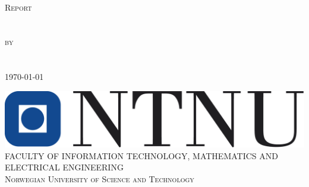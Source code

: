 \begin{titlepage}
\thispagestyle{empty}
\centering
\textsc{\MyFag{}} \\[3cm]
\textsc{\LARGE Report} \\
\textsc{\Mylab{}} \\[1cm]
\textsc{\Huge \MyTitle{}} \\[1cm]
\textsc{by} \\
\textsc{\MyAuthor{}} \\[1cm]
\textsc{\MyGroup{}} \\ [1cm]
\textsc{\large \today}

\begin{flushbottom}
\vfill
\includegraphics[scale=0.5]{img/ntnu} \\[0.5cm]
\textsc{\small FACULTY OF INFORMATION TECHNOLOGY, MATHEMATICS AND ELECTRICAL ENGINEERING \\ Norwegian University of Science and Technology}
\end{flushbottom}
\end{titlepage}